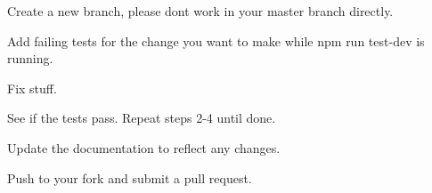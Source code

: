\begin{DoxyEnumerate}
\item Create a new branch, please don\textquotesingle{}t work in your {\ttfamily master} branch directly.
\end{DoxyEnumerate}
\begin{DoxyEnumerate}
\item Add failing tests for the change you want to make while {\ttfamily npm run test-\/dev} is running.
\end{DoxyEnumerate}
\begin{DoxyEnumerate}
\item Fix stuff.
\end{DoxyEnumerate}
\begin{DoxyEnumerate}
\item See if the tests pass. Repeat steps 2-\/4 until done.
\end{DoxyEnumerate}
\begin{DoxyEnumerate}
\item Update the documentation to reflect any changes.
\end{DoxyEnumerate}
\begin{DoxyEnumerate}
\item Push to your fork and submit a pull request. 
\end{DoxyEnumerate}